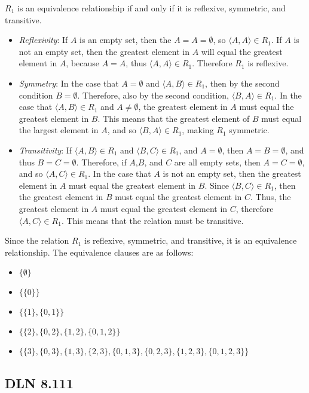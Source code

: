 \documentclass[titlepage]{article}
\begin{document}
$R_1$ is an equivalence relationship if and only if it is reflexive, symmetric, and transitive.
\begin{itemize}
\item \emph{Reflexivity}: If $A$ is an empty set, then the $A = A = \emptyset$, so $\langle A,A \rangle \in R_1$. If $A$ is not an empty set, then the greatest element in $A$ will equal the greatest element in $A$, because $A=A$, thus $\langle A,A \rangle \in R_1$. Therefore $R_1$ is reflexive.
\item \emph{Symmetry}: In the case that $A = \emptyset$ and $\langle A,B\rangle \in R_1$, then by the second condition $B = \emptyset$. Therefore, also by the second condition, $\langle B,A\rangle \in R_1$. In the case that $\langle A,B\rangle \in R_1$ and $A \neq \emptyset$, the greatest element in $A$ must equal the greatest element in $B$. This means that the greatest element of $B$ must equal the largest element in $A$, and so $\langle B,A\rangle \in R_1$, making $R_1$ symmetric.
\item \emph{Transitivity}: If $\langle A,B \rangle \in R_1$ and $\langle B,C \rangle \in R_1$, and $A = \emptyset$, then $A=B=\emptyset$, and thus $B=C=\emptyset$. Therefore, if $A$,$B$, and $C$ are all empty sets, then $A=C=\emptyset$, and so $\langle A,C \rangle \in R_1$. In the case that $A$ is not an empty set, then the greatest element in $A$ must equal the greatest element in $B$. Since $\langle B,C \rangle \in R_1$, then the greatest element in $B$ must equal the greatest element in $C$. Thus, the greatest element in $A$ must equal the greatest element in $C$, therefore $\langle A,C \rangle \in R_1$. This means that the relation must be transitive.
\end{itemize}
Since the relation $R_1$ is reflexive, symmetric, and transitive, it is an equivalence relationship. The equivalence clauses are as follows:
\begin{itemize}
\item $\{ \emptyset\} $
\item $\{ \{0\}\} $
\item $\{ \{1\}, \{0,1\}\} $
\item $\{ \{2\}, \{0,2\}, \{1,2\}, \{0,1,2\}\} $
\item $\{ \{3\}, \{0,3\}, \{1,3\}, \{2,3\}, \{0,1,3\}, \{0,2,3\}, \{1,2,3\}, \{0,1,2,3\}\} $
\end{itemize}

\subsection{DLN 8.111} 
\end{document}
